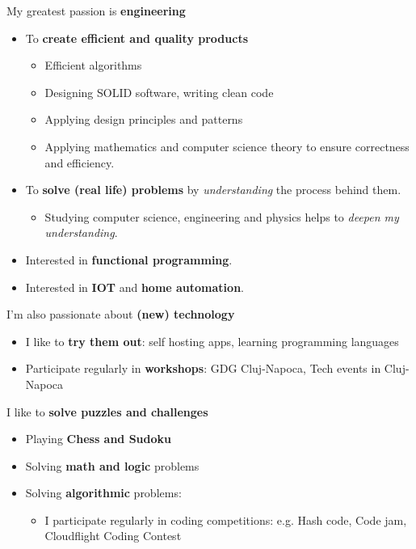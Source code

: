 
My greatest passion is \textbf{engineering} 

\begin{itemize}
\item To \textbf{create efficient and quality products}

\begin{itemize}
\item Efficient algorithms

\item Designing SOLID software, writing clean code

\item Applying design principles and patterns

\item Applying mathematics and computer science theory to ensure correctness and efficiency.

\end{itemize}
 
\item To \textbf{solve (real life) problems} by \textit{understanding} the process behind them.
\begin{itemize}
 \item Studying computer science, engineering and physics helps to \textit{deepen my understanding}.
\end{itemize}


\item Interested in \textbf{functional programming}.

\item Interested in \textbf{IOT} and \textbf{home automation}.

\end{itemize}

\divider

I'm also passionate about \textbf{(new) technology}

\begin{itemize}
 \item I like to \textbf{try them out}: self hosting apps, learning programming languages
 \item Participate regularly in \textbf{workshops}: GDG Cluj-Napoca, Tech events in Cluj-Napoca
\end{itemize} 

\divider

I like to \textbf{solve puzzles and challenges}
\begin{itemize}
 \item Playing \textbf{Chess and Sudoku}
 \item Solving \textbf{math and logic} problems
 \item Solving \textbf{algorithmic} problems:
 \begin{itemize}
  \item I participate regularly in coding competitions: e.g. Hash code, Code jam, Cloudflight Coding Contest
 \end{itemize}

\end{itemize} 

